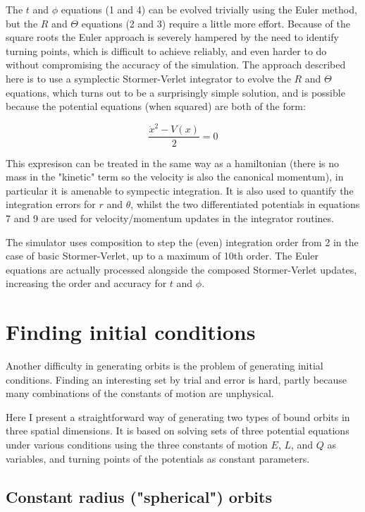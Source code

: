 \documentclass[11pt]{article}
\begin{document}
The $t$ and $\phi$ equations (1 and 4) can be evolved trivially using the Euler method, but the $R$ and $\Theta$ equations (2 and 3) require a little more effort.  Because of the square roots the Euler approach is severely hampered by the need to identify turning points, which is difficult to achieve reliably, and even harder to do without compromising the accuracy of the simulation.  The approach described here is to use a symplectic Stormer-Verlet integrator \cite{hairer} to evolve the $R$ and $\Theta$ equations, which turns out to be a surprisingly simple solution, and is possible because the potential equations (when squared) are both of the form:

\begin{equation}
\frac {\dot x^2 - V(x)}{2} = 0
\end{equation}

This expresison can be treated in the same way as a hamiltonian (there is no mass in the "kinetic" term so the velocity is also the canonical momentum), in particular it is amenable to sympectic integration.  It is also used to quantify the integration errors for $r$ and $\theta$, whilst the two differentiated potentials in equations 7 and 9 are used for velocity/momentum updates in the integrator routines.

The simulator uses composition \cite{hairer} to step the (even) integration order from 2 in the case of basic Stormer-Verlet, up to a maximum of 10th order.  The Euler equations are actually processed alongside the composed Stormer-Verlet updates, increasing the order and accuracy for $t$ and $\phi$.

\section{Finding initial conditions}

Another difficulty in generating orbits is the problem of generating initial conditions.  Finding an interesting set by trial and error is hard, partly because many combinations of the constants of motion are unphysical.

Here I present a straightforward way of generating two types of bound orbits in three spatial dimensions.  It is based on solving sets of three potential equations under various conditions using the three constants of motion $E$, $L$, and $Q$ as variables, and turning points of the potentials as constant parameters.

\subsection{Constant radius ("spherical") orbits}
\end{document}
